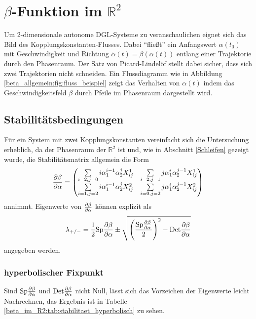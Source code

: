 \clearpage
\section{$\beta$-Funktion im $\mathbb{R}^2$}\label{beta_im_R2}
   Um 2-dimensionale autonome DGL-Systeme zu veranschaulichen eignet sich das 
   Bild des Kopplungskonstanten-Flusses. Dabei "`fließt"' ein Anfangswert 
   $\alpha(t_0)$ mit Geschwindigkeit und Richtung $\dot\alpha(t) = 
   \beta(\alpha(t))$ entlang einer Trajektorie durch 
   den Phasenraum. Der Satz von Picard-Lindelöf stellt dabei sicher, dass 
   sich zwei Trajektorien nicht schneiden. Ein Flussdiagramm wie in Abbildung 
   \ref{beta_allgemein:fig:fluss_beispiel} zeigt das Verhalten von $\alpha(t)$ 
   indem das Geschwindigkeitsfeld $\beta$ durch Pfeile im Phasenraum 
   dargestellt wird.
    

  \subsection{Stabilitätsbedingungen}
    Für ein System mit zwei Kopplungskonstanten vereinfacht sich die 
    Untersuchung erheblich, da der Phasenraum der $\mathbb{R}^2$ ist und, wie in 
    Abschnitt \ref{Schleifen} gezeigt wurde, die Stabilitätsmatrix allgemein 
    die Form
	\begin{equation}
	 \frac{\partial \beta}{\partial \alpha} = \begin{pmatrix}
	          \sum\limits_{i=2,j=0}i \alpha_1^{i-1} \alpha_2^j X^1_{ij} &
	          \sum\limits_{i=2,j=1}j \alpha_1^i \alpha_2^{j-1} X^1_{ij}\\
	          \sum\limits_{i=1,j=2}i \alpha_1^{i-1} \alpha_2^j X^2_{ij} &
	          \sum\limits_{i=0,j=2}j \alpha_1^i \alpha_2^{j-1} X^2_{ij}
	         \end{pmatrix}\label{eq:beta_im_R2:stab_matrix}
	\end{equation}
    annimmt. Eigenwerte von $\frac{\partial \beta}{\partial \alpha}$ können explizit 
    als\begin{equation}
    \lambda_{+/-}=\frac12 \text{Sp} \frac{\partial \beta}{\partial \alpha} \pm \sqrt{ \left( \frac{\text{Sp} \frac{\partial \beta}{\partial \alpha}}{2} \right)^2-\text{Det} \frac{\partial \beta}{\partial \alpha} }
    \end{equation}
    angegeben werden. 
    \subsubsection{hyperbolischer Fixpunkt}
      Sind $\text{Sp} \frac{\partial \beta}{\partial \alpha}$ und $\text{Det} \frac{\partial \beta}{\partial \alpha}$ nicht Null, lässt sich das Vorzeichen der 
      Eigenwerte leicht Nachrechnen, das Ergebnis ist in Tabelle 
      \ref{beta_im_R2:tab:stabilitaet_hyperbolisch} zu sehen.
  
